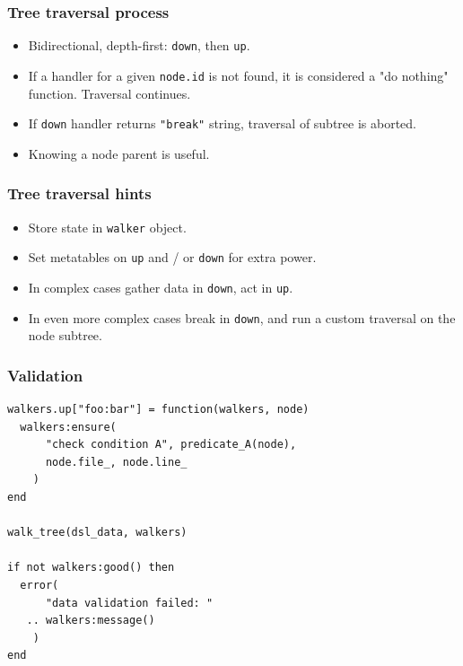 \documentclass[handout]{beamer}
\begin{document}
\begin{frame}[fragile]

\frametitle{Tree traversal process}

\begin{itemize}
\item Bidirectional, depth-first: \verb|down|, then \verb|up|.
\pause
\item If a handler for a given \verb|node.id| is not found,
      it is considered a "do nothing" function. Traversal continues.
\pause
\item If \verb|down| handler returns \verb|"break"| string,
      traversal of subtree is aborted.
\pause
\item Knowing a node parent is useful.
\end{itemize}

\end{frame}


\begin{frame}[fragile]

\frametitle{Tree traversal hints}

\begin{itemize}
\item Store state in \verb|walker| object.
\pause
\item Set metatables on \verb|up| and / or \verb|down| for extra power.
\pause
\item In complex cases gather data in \verb|down|, act in \verb|up|.
\pause
\item In even more complex cases break in \verb|down|, and run
      a custom traversal on the node subtree.
\end{itemize}

\end{frame}


\begin{frame}[fragile]

\frametitle{Validation}

\begin{verbatim}
walkers.up["foo:bar"] = function(walkers, node)
  walkers:ensure(
      "check condition A", predicate_A(node),
      node.file_, node.line_
    )
end

walk_tree(dsl_data, walkers)

if not walkers:good() then
  error(
      "data validation failed: "
   .. walkers:message()
    )
end
\end{verbatim}

\end{frame}
\end{document}
